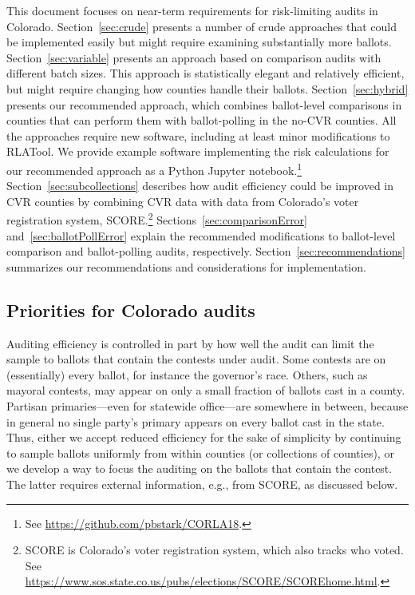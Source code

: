 \documentclass[12pt]{article}
\begin{document}
This document focuses on near-term requirements for risk-limiting audits in Colorado.
Section~\ref{sec:crude} presents a number of crude approaches
that could be implemented easily
but might require examining substantially more ballots.
Section~\ref{sec:variable}
presents an approach based on comparison audits with different batch sizes.
This approach is statistically elegant and relatively efficient, but might require changing how counties
handle their ballots.
Section~\ref{sec:hybrid} presents our recommended approach, which combines ballot-level
comparisons in counties that can perform them with ballot-polling in the no-CVR counties.
All the approaches require new software, including at least minor modifications to RLATool.
We provide example software implementing the risk calculations for
our recommended approach as a Python Jupyter notebook.\footnote{%
 See \url{https://github.com/pbstark/CORLA18}.
}
Section~\ref{sec:subcollections}
describes how audit efficiency could be improved in CVR counties by combining CVR
data with data from Colorado's voter registration system, SCORE.\footnote{%
  SCORE is Colorado's voter registration system, which also tracks who voted.
  See \url{https://www.sos.state.co.us/pubs/elections/SCORE/SCOREhome.html}.
} 
Sections~\ref{sec:comparisonError} and~\ref{sec:ballotPollError} explain the recommended
modifications to ballot-level comparison and ballot-polling audits, respectively. 
Section~\ref{sec:recommendations} summarizes our recommendations and
considerations for implementation.

\subsection{Priorities for Colorado audits}

Auditing efficiency is controlled in part by how well the audit can limit the sample to ballots that
contain the contests under audit.
Some contests are on (essentially) every ballot, for instance the governor's race.
Others, such as mayoral contests, may appear on only a small fraction of ballots cast in
a county.
Partisan primaries---even for statewide office---are somewhere in between,
because in general no single party's primary appears on every ballot cast in the state.
Thus, either we accept reduced %
efficiency for the sake of simplicity by continuing to sample ballots uniformly from within 
counties (or collections of counties), or we develop a way to
focus the auditing on the ballots that contain the contest.
The latter requires external information, e.g., from SCORE,
as discussed below.
\end{document}
